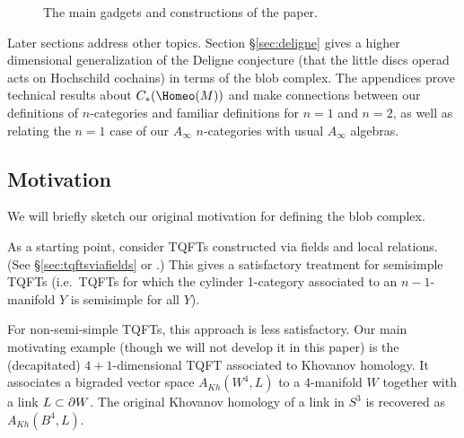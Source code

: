 \begin{figure}[t]
{
\endpgfgraphicnamed%
\mbox{} %
}
\caption{The main gadgets and constructions of the paper.}
\label{fig:outline}
\end{figure}

Later sections address other topics.
Section \S \ref{sec:deligne} gives
a higher dimensional generalization of the Deligne conjecture 
(that the little discs operad acts on Hochschild cochains) in terms of the blob complex.
The appendices prove technical results about $\CH{M}$ and
make connections between our definitions of $n$-categories and familiar definitions for $n=1$ and $n=2$, 
as well as relating the $n=1$ case of our $A_\infty$ $n$-categories with usual $A_\infty$ algebras. 



\subsection{Motivation}
\label{sec:motivations}

We will briefly sketch our original motivation for defining the blob complex.

As a starting point, consider TQFTs constructed via fields and local relations.
(See \S\ref{sec:tqftsviafields} or \cite{kw:tqft}.)
This gives a satisfactory treatment for semisimple TQFTs
(i.e.\ TQFTs for which the cylinder 1-category associated to an
$n{-}1$-manifold $Y$ is semisimple for all $Y$).

For non-semi-simple TQFTs, this approach is less satisfactory.
Our main motivating example (though we will not develop it in this paper)
is the (decapitated) $4{+}1$-dimensional TQFT associated to Khovanov homology.
It associates a bigraded vector space $A_{Kh}(W^4, L)$ to a 4-manifold $W$ together
with a link $L \subset \partial W$.
The original Khovanov homology of a link in $S^3$ is recovered as $A_{Kh}(B^4, L)$.

